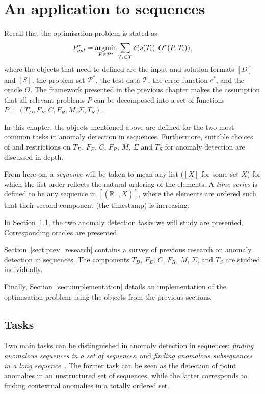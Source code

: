 \chapter{An application to sequences}
\label{ch:time_series}

Recall that the optimisation problem is stated as
\[
    P^*_{opt} = \argmin_{P \in \mathcal{P}^*} \sum_{T_i \in \mathcal{T}} \delta(s(T_i), O^*(P, T_i)),
\]
where the objects that need to defined are the input and solution formats $[D]$ and $[S]$, the problem set $\mathcal{P}^*$, the test data $\mathcal{T}$, the error function $\epsilon^*$, and the oracle $O$. The framework presented in the previous chapter makes the assumption that all relevant problems $P$ can be decomposed into a set of functions $P = (T_D, F_E, C, F_R, M, \Sigma, T_S)$.

In this chapter, the objects mentioned above are defined for the two most common tasks in anomaly detection in sequences. Furthermore, suitable choices of and restrictions on $T_D$, $F_E$, $C$, $F_R$, $M$, $\Sigma$ and $T_S$ for anomaly detection are discussed in depth.

From here on, a \emph{sequence} will be taken to mean any list ($[X]$ for some set $X$) for which the list order reflects the natural ordering of the elements. A \emph{time series} is defined to be any sequence in $[(\mathbb{R}^+, X)]$, where the elements are ordered such that their second component (the timestamp) is increasing.

In Section~\ref{sect:tasks}, the two anomaly detection tasks we will study are presented. Corresponding oracles are presented.

Section~\ref{sect:prev_research} contains a survey of previous research on anomaly detection in sequences. The components $T_D$, $F_E$, $C$, $F_R$, $M$, $\Sigma$, and $T_S$ are studied individually.

Finally, Section~\ref{sect:implementation} details an implementation of the optimisation problem using the objects from the previous sections.

\section{Tasks}
\label{sect:tasks}

Two main tasks can be distinguished in anomaly detection in sequences: \emph{finding anomalous sequences in a set of sequences}, and \emph{finding anomalous subsequences in a long sequence}~\cite{chandola}. The former task can be seen as the detection of point anomalies in an unstructured set of sequences, while the latter corresponds to finding contextual anomalies in a totally ordered set.

